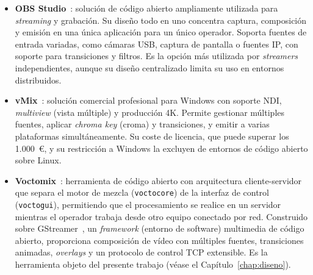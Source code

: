 \begin{itemize}
  \item \textbf{OBS Studio}~\cite{obs_studio}: solución de código abierto ampliamente
  utilizada para \textit{streaming} y grabación. Su diseño todo en uno concentra
  captura, composición y emisión en una única aplicación para un único operador.
  Soporta fuentes de entrada variadas, como cámaras USB, captura de pantalla o fuentes
  IP, con soporte para transiciones y filtros. Es la opción más utilizada por
  \textit{streamers} independientes, aunque su diseño centralizado limita su uso en
  entornos distribuidos.

  \item \textbf{vMix}~\cite{vmix_software}: solución comercial profesional para Windows
  con soporte NDI, \textit{multiview} (vista múltiple) y producción 4K. Permite gestionar múltiples
  fuentes, aplicar \textit{chroma key} (croma) y transiciones, y emitir a varias plataformas
  simultáneamente. Su coste de licencia, que puede superar los 1.000~\euro, y su
  restricción a Windows la excluyen de entornos de código abierto sobre Linux.

  \item \textbf{Voctomix}~\cite{voctomix_github}: herramienta de código abierto con
  arquitectura cliente-servidor que separa el motor de mezcla (\texttt{voctocore}) de
  la interfaz de control (\texttt{voctogui}), permitiendo que el procesamiento se
  realice en un servidor mientras el operador trabaja desde otro equipo conectado por
  red. Construido sobre GStreamer~\cite{gstreamer_docs}, un \textit{framework} (entorno
  de software) multimedia de código abierto, proporciona composición de vídeo con
  múltiples fuentes, transiciones animadas, \textit{overlays} y un protocolo de
  control TCP extensible. Es la herramienta objeto del presente trabajo (véase el
  Capítulo~\ref{chap:diseno}).
\end{itemize}

